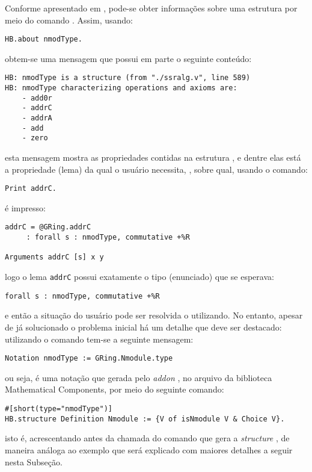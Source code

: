 {{Conforme apresentado em \cite{mathcomp-contributing}, pode-se obter informações sobre uma estrutura por meio do comando . Assim, usando:
    \begin{lstlisting}[language=coq,frame=single,tabsize=1]
HB.about nmodType.
    \end{lstlisting}
obtem-se uma mensagem que possui em parte o seguinte conteúdo:
    \begin{lstlisting}[language=coq-error,frame=single,tabsize=1]
HB: nmodType is a structure (from "./ssralg.v", line 589)
HB: nmodType characterizing operations and axioms are:
    - add0r
    - addrC
    - addrA
    - add
    - zero
    \end{lstlisting}
esta mensagem mostra as propriedades contidas na estrutura , e dentre elas está a propriedade (lema) da qual o usuário necessita, , sobre qual, usando o comando:
    \begin{lstlisting}[language=coq,frame=single,tabsize=1]
Print addrC.
    \end{lstlisting}
é impresso:
    \begin{lstlisting}[language=coq-error,frame=single,tabsize=1]
addrC = @GRing.addrC
     : forall s : nmodType, commutative +%R

Arguments addrC [s] x y
    \end{lstlisting}
logo o lema \lstinline[language = coq]!addrC! possui exatamente o tipo (enunciado) que se esperava:
    \begin{lstlisting}[language=coq,frame=single,tabsize=1]
forall s : nmodType, commutative +%R
    \end{lstlisting}
e então a situação do usuário pode ser resolvida o utilizando.
No entanto, apesar de já solucionado o problema inicial há um detalhe que deve ser destacado: utilizando o comando  tem-se a seguinte mensagem:
    \begin{lstlisting}[language=coq-error,frame=single,tabsize=1]
Notation nmodType := GRing.Nmodule.type
    \end{lstlisting}
ou seja,  é uma notação que gerada pelo \textit{addon} , no arquivo \cite{mathcomp-ssralg} da biblioteca Mathematical Components, por meio do seguinte comando:
    \begin{lstlisting}[language=coq, frame=single, tabsize=1]
#[short(type="nmodType")]
HB.structure Definition Nmodule := {V of isNmodule V & Choice V}.
    \end{lstlisting}
isto é, acrescentando \coqinline[]{#[short(type="nmodType")]} antes da chamada do comando  que gera a \textit{structure} , de maneira análoga ao exemplo que será explicado com maiores detalhes a seguir nesta Subseção.

}}
